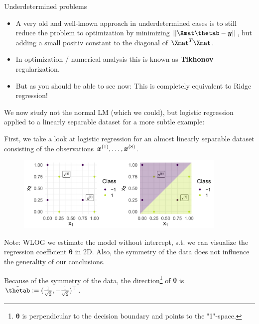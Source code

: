 \begin{vbframe} {Underdetermined problems}
\framebreak
  \begin{itemize}
   \item A very old and well-known approach in underdetermined cases is to still reduce the problem to optimization by minimizing $|| \Xmat \thetab - \bm{y}||$, but adding a small positiv constant to the diagonal of $\Xmat^T \Xmat$.
   \item In optimization / numerical analysis this is known as \textbf{Tikhonov} regularization. 
   \item But as you should be able to see now: This is completely equivalent to Ridge regression!
  \end{itemize}

\framebreak
\begin{footnotesize}
We now study not the normal LM (which we could), but logistic regression applied to a linearly separable dataset for a more subtle example:

\medskip
First, we take a look at logistic regression for an almost linearly separable dataset consisting of the observations $\bm{x}^{(1)}, \dots, \bm{x}^{(8)}$.
\vfill

\begin{figure}
\includegraphics[width=0.9\textwidth]{figure_man/undet-problem01.png}\\
\end{figure}


Note: WLOG we estimate the
model without intercept, s.t. we can visualize the regression coefficient 
$\bm{\theta}$ in 2D. Also, the symmetry of the data does not influence the generality of our conclusions.
\end{footnotesize}

\framebreak
\begin{footnotesize}
Because of the symmetry of the data, the direction\footnote[frame]{$\bm{\theta}$ is perpendicular to the decision boundary and points to the "1"-space.} of $\bm{\theta}$ is $\tilde\thetab := (\frac{1}{\sqrt{2}}, -\frac{1}{\sqrt{2}})^\top$.

\medskip


\end{footnotesize}
\end{vbframe}

